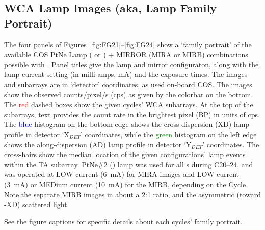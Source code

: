 \subsection{WCA Lamp Images (aka, Lamp Family Portrait) \label{subsec:fportrait} }
\normalsize

The four panels of Figures~\ref{fig:FG21}--\ref{fig:FG24} show a `family portrait' of the available COS PtNe Lamp (\plampone{} or \plamptwo{}) + MIRROR (MIRA or MIRB)
combinations possible with .
Panel titles give the lamp and mirror configuraton, along with the lamp current setting (in milli-amps, mA) and the exposure times.
The images and subarrays are in `detector' coordinates, as used on-board COS.
The images show the observed counts/pixel/s (cps) as given by the colorbar on the bottom.
The \textcolor{red}{red} dashed boxes show the given cycles'  WCA subarrays. At the top of the subarrays, text provides the count rate in the brightest pixel (BP) in units of cps.
The \textcolor{blue}{blue} histogram on the bottom edge shows the cross-dispersion (XD) lamp profile in detector `X$_{DET}$' coordinates, while
the \textcolor{green}{green} histogram on the left edge shows the along-dispersion (AD) lamp profile in detector `Y$_{DET}$' coordinates.
The cross-hairs show the median location of the given configurations' lamp events within the TA subarray.
PtNe\#2 (\plamptwo{}) lamp was used for all s during C20--24, and was operated at LOW current (6~mA) for MIRA images
and LOW current (3~mA) or MEDium current (10~mA) for the MIRB, depending on the Cycle. Note the separate MIRB images in about a 2:1 ratio, and the asymmetric
(toward -XD) scattered light.

See the figure captions for specific details about each cycles' family portrait.

